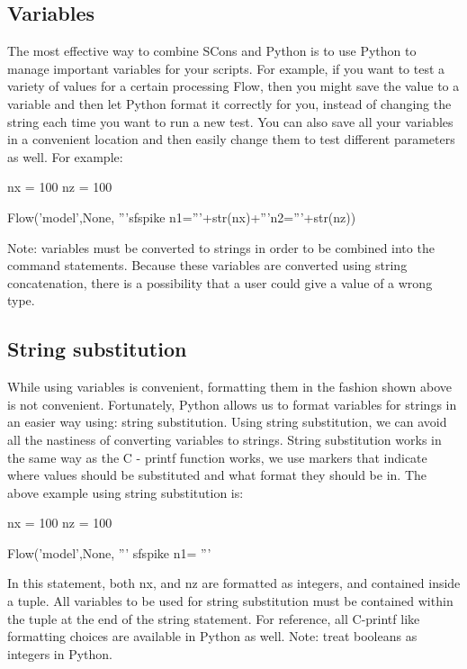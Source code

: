\subsection{Variables}

The most effective way to combine SCons and Python is to use Python to manage important variables for your scripts.  For example, if you want to test a variety of values for a certain processing Flow, then you might save the value to a variable and then let Python format it correctly for you, instead of changing the string each time you want to run a new test.  You can also save all your variables in a convenient location and then easily change them to test different parameters as well.  For example:

\begin{verbatimtab}[4]
nx = 100
nz = 100

Flow('model',None,
	'''sfspike n1='''+str(nx)+'''n2='''+str(nz))
\end{verbatimtab}
Note: variables must be converted to strings in order to be combined into the command statements.  Because these variables are converted using string concatenation, there is a possibility that a user could give a value of a wrong type.  

\subsection{String substitution}

While using variables is convenient, formatting them in the fashion shown above is not convenient.  Fortunately, Python allows us to format variables for strings in an easier way using: string substitution.  Using string substitution, we can avoid all the nastiness of converting variables to strings.  String substitution works in the same way as the C - printf function works, we use markers that indicate where values should be substituted and what format they should be in.  The above example using string substitution is:

\begin{verbatimtab}[4]
nx = 100
nz = 100

Flow('model',None,
	'''
	sfspike n1=%
	''' %
\end{verbatimtab}

In this statement, both nx, and nz are formatted as integers, and contained inside a tuple.  All variables to be used for string substitution must be contained within the tuple at the end of the string statement.  For reference, all C-printf like formatting choices are available in Python as well.  Note: treat booleans as integers in Python.

